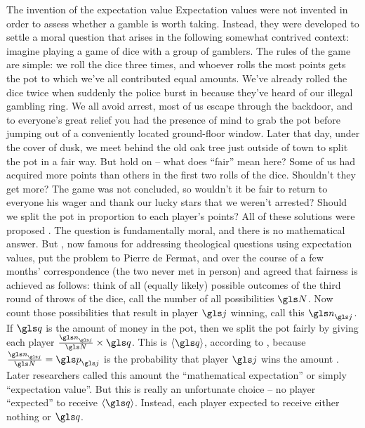 \begin{history}{The invention of the expectation value}
Expectation values 
were not invented in order to assess whether a gamble is 
worth taking. Instead, they were developed to settle a  
moral question that arises in the following somewhat contrived 
context: imagine playing a game of dice with a 
group of gamblers. The rules of the game are simple: we 
roll the dice three times,  and whoever rolls the most points 
gets the pot to which we've all contributed equal amounts. 
We've already rolled the dice twice when suddenly the 
police burst in because they've heard of our illegal gambling ring. 
We all avoid arrest, most of us escape through the backdoor, 
and to everyone's great relief you had the presence of mind 
to grab the pot before jumping out of a conveniently located 
ground-floor window. Later that day, under the cover of dusk, 
we meet behind the old oak tree just outside of town to split 
the pot in a fair way. But hold on -- what does ``fair'' mean here?
Some of us had acquired more points than others in the first 
two rolls of the dice. Shouldn't they get more? The game was 
not concluded, so wouldn't it be fair to return to everyone his 
wager and thank our lucky stars that we weren't arrested? 
Should we split the pot in proportion to each player's points? 
All of these solutions were proposed \cite{Devlin2008}.
The question is fundamentally moral, and there is no 
mathematical answer. But , now famous for 
addressing theological questions using expectation values, put the 
problem to Pierre de Fermat, and over the course of a few months' 
correspondence (the two never met in person)  and 
 agreed that fairness is achieved as follows: 
think of all (equally likely) possible outcomes of the third round 
of throws of the dice, call the number of all possibilities $\N$. 
Now count those possibilities that result in player $\gj$ winning, 
call this $\gn_\gj$. If $\q$ is the amount of money in the pot, then 
we split the pot fairly by giving each player
 $\frac{\gn_\gj}{\N}\times \q$.
This is $\ave{\q}$, according to , 
because $\frac{\gn_\gj}{\N}=\p_\gj$ is the probability that player $\gj$ wins the
amount \q. 
Later researchers called this amount the ``mathematical expectation''  
or simply ``expectation value''. But this is really an unfortunate choice 
 -- no player ``expected'' to receive $\ave{\q}$. 
Instead, each player expected to receive either nothing or $\q$. 
\end{history}

